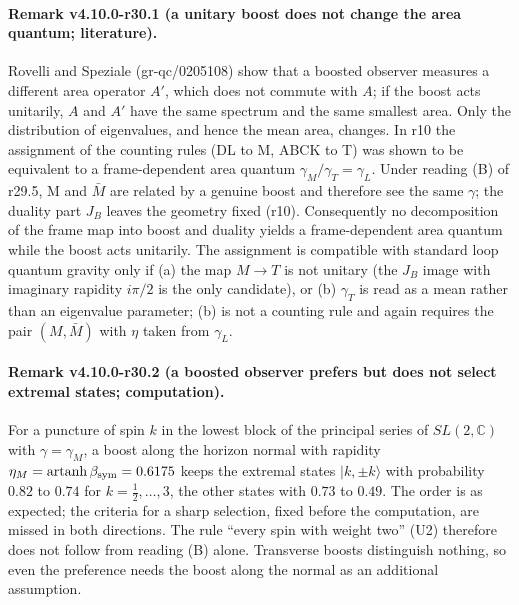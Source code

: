 \paragraph{Remark v4.10.0-r30.1 (a unitary boost does not change the area quantum; literature).}
Rovelli and Speziale (gr-qc/0205108) show that a boosted observer measures a different area operator \(A'\), which does not commute with \(A\); if the
boost acts unitarily, \(A\) and \(A'\) have the same spectrum and the same smallest area.  Only the distribution of eigenvalues, and hence the mean
area, changes.  In r10 the assignment of the counting rules (DL to M, ABCK to T) was shown to be equivalent to a frame-dependent area quantum
\(\gamma_M/\gamma_T=\gamma_L\).  Under reading (B) of r29.5, M and \(\bar M\) are related by a genuine boost and therefore see the same \(\gamma\);
the duality part \(J_B\) leaves the geometry fixed (r10).  Consequently no decomposition of the frame map into boost and duality yields a
frame-dependent area quantum while the boost acts unitarily.  The assignment is compatible with standard loop quantum gravity only if
(a) the map \(M\to T\) is not unitary (the \(J_B\) image with imaginary rapidity \(i\pi/2\) is the only candidate), or (b) \(\gamma_T\) is read as a
mean rather than an eigenvalue parameter; (b) is not a counting rule and again requires the pair \((M,\bar M)\) with \(\eta\) taken from \(\gamma_L\).

\paragraph{Remark v4.10.0-r30.2 (a boosted observer prefers but does not select extremal states; computation).}
For a puncture of spin \(k\) in the lowest block of the principal series of \(SL(2,\mathbb C)\) with \(\gamma=\gamma_M\), a boost along the horizon
normal with rapidity \(\eta_M=\operatorname{artanh}\beta_{\rm sym}=0.6175\) keeps the extremal states \(|k,\pm k\rangle\) with probability
\(0.82\) to \(0.74\) for \(k=\tfrac12,\dots,3\), the other states with \(0.73\) to \(0.49\).  The order is as expected; the criteria for a sharp
selection, fixed before the computation, are missed in both directions.  The rule ``every spin with weight two'' (U2) therefore does not follow from
reading (B) alone.  Transverse boosts distinguish nothing, so even the preference needs the boost along the normal as an additional assumption.

